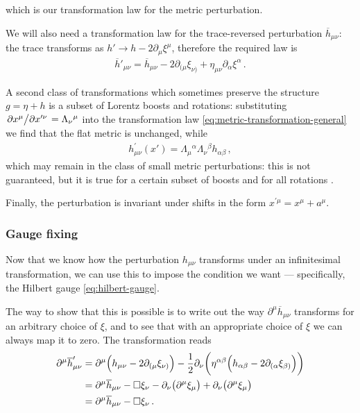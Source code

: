 \documentclass[main.tex]{subfiles}
\begin{document}
%
%
which is our transformation law for the metric perturbation. 

We will also need a transformation law for the trace-reversed perturbation \(\overline{h}_{\mu \nu }\): the trace transforms as \(h' \to h - 2 \partial_{\mu } \xi^{\mu }\), therefore the required law is 
%
\begin{align} \label{eq:perturbation-transformation-infinitesimal-tracereversed}
\overline{h}'_{\mu \nu } = \overline{h}_{\mu \nu } - 2 \partial_{(\mu } \xi_{\nu )} + \eta_{\mu \nu } \partial_{\alpha } \xi^{\alpha }
\,.
\end{align}


A second class of transformations which sometimes preserve the structure \(g = \eta + h\) is a subset of Lorentz boosts and rotations: substituting \(\pdv*{x^{\mu }}{x^{\prime \nu }} = \Lambda_\nu{}^{\mu }\) into the transformation law \eqref{eq:metric-transformation-general} we find that the flat metric is unchanged, while 
%
\begin{align}
h^{\prime }_{\mu \nu } ( x') = \Lambda_{\mu }{}^{\alpha }
\Lambda_{\nu }{}^{\beta } h_{\alpha \beta }
\,,
\end{align}
%
which may remain in the class of small metric perturbations: this is not guaranteed, but it is true for a certain subset of boosts and for all rotations \cite{maggioreGravitationalWavesVolume2007}. 

Finally, the perturbation is invariant under shifts in the form \(x^{\prime \mu }= x^{\mu } + a^{\mu }\). 

\subsubsection{Gauge fixing} \label{sec:gauge-fixing}

Now that we know how the perturbation \(h_{\mu \nu }\) transforms under an infinitesimal transformation, we can use this to impose the condition we want --- specifically, the Hilbert gauge \eqref{eq:hilbert-gauge}.

The way to show that this is possible is to write out the way \(\partial^{\mu } \overline{h}_{\mu \nu }\) transforms for an arbitrary choice of \(\xi \), and to see that with an appropriate choice of \(\xi \) we can always map it to zero. 
The transformation reads 
%
\begin{align}
\partial^{\mu } \overline{h}_{\mu \nu }' &= 
\partial^{\mu } \qty(h_{\mu \nu } - 2 \partial_{(\mu } \xi_{\nu )}) - \frac{1}{2} \partial_{\nu } \qty(\eta^{\alpha \beta } \qty(h_{\alpha \beta } - 2 \partial_{(\alpha } \xi_{\beta )}))  \\
&= \partial^{\mu } \overline{h}_{\mu \nu } - \square \xi_{\nu } - \partial_{\nu } \qty(\partial^{\mu } \xi_{\mu }) + \partial_{\nu } \qty(\partial^{\mu } \xi_{\mu })  \\
&= \partial^{\mu } \overline{h}_{\mu \nu } - \square \xi_{\nu }
\,. 
\end{align}
\end{document}

